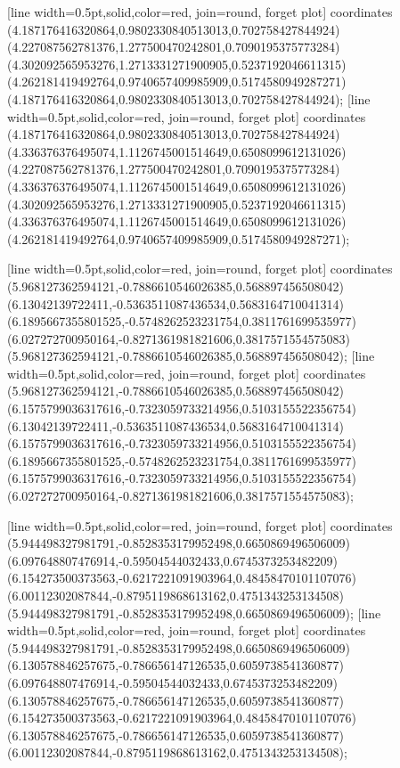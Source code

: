 [line width=0.5pt,solid,color=red, join=round, forget plot] coordinates {(4.187176416320864,0.9802330840513013,0.702758427844924) (4.227087562781376,1.277500470242801,0.7090195375773284) (4.302092565953276,1.2713331271900905,0.5237192046611315) (4.262181419492764,0.9740657409985909,0.5174580949287271) (4.187176416320864,0.9802330840513013,0.702758427844924)};
[line width=0.5pt,solid,color=red, join=round, forget plot] coordinates {(4.187176416320864,0.9802330840513013,0.702758427844924) (4.336376376495074,1.1126745001514649,0.6508099612131026) (4.227087562781376,1.277500470242801,0.7090195375773284) (4.336376376495074,1.1126745001514649,0.6508099612131026) (4.302092565953276,1.2713331271900905,0.5237192046611315) (4.336376376495074,1.1126745001514649,0.6508099612131026) (4.262181419492764,0.9740657409985909,0.5174580949287271)};

[line width=0.5pt,solid,color=red, join=round, forget plot] coordinates {(5.968127362594121,-0.7886610546026385,0.568897456508042) (6.13042139722411,-0.5363511087436534,0.5683164710041314) (6.1895667355801525,-0.5748262523231754,0.3811761699535977) (6.027272700950164,-0.8271361981821606,0.3817571554575083) (5.968127362594121,-0.7886610546026385,0.568897456508042)};
[line width=0.5pt,solid,color=red, join=round, forget plot] coordinates {(5.968127362594121,-0.7886610546026385,0.568897456508042) (6.1575799036317616,-0.7323059733214956,0.5103155522356754) (6.13042139722411,-0.5363511087436534,0.5683164710041314) (6.1575799036317616,-0.7323059733214956,0.5103155522356754) (6.1895667355801525,-0.5748262523231754,0.3811761699535977) (6.1575799036317616,-0.7323059733214956,0.5103155522356754) (6.027272700950164,-0.8271361981821606,0.3817571554575083)};

[line width=0.5pt,solid,color=red, join=round, forget plot] coordinates {(5.944498327981791,-0.8528353179952498,0.6650869496506009) (6.097648807476914,-0.59504544032433,0.6745373253482209) (6.154273500373563,-0.6217221091903964,0.48458470101107076) (6.00112302087844,-0.8795119868613162,0.4751343253134508) (5.944498327981791,-0.8528353179952498,0.6650869496506009)};
[line width=0.5pt,solid,color=red, join=round, forget plot] coordinates {(5.944498327981791,-0.8528353179952498,0.6650869496506009) (6.130578846257675,-0.786656147126535,0.6059738541360877) (6.097648807476914,-0.59504544032433,0.6745373253482209) (6.130578846257675,-0.786656147126535,0.6059738541360877) (6.154273500373563,-0.6217221091903964,0.48458470101107076) (6.130578846257675,-0.786656147126535,0.6059738541360877) (6.00112302087844,-0.8795119868613162,0.4751343253134508)};

